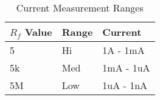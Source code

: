 \begin{table}[ht!]
\centering
\begin{tabular}{|l|l|l|}
\hline
$R_f$ Value & Range & Current   \\ \hline
5           & Hi    & 1A  - 1mA \\ \hline
5k          & Med   & 1mA - 1uA \\ \hline
5M          & Low   & 1uA - 1nA \\ \hline
\end{tabular}
\caption{Current Measurement Ranges}
\label{table:imeas_table}
\end{table}
